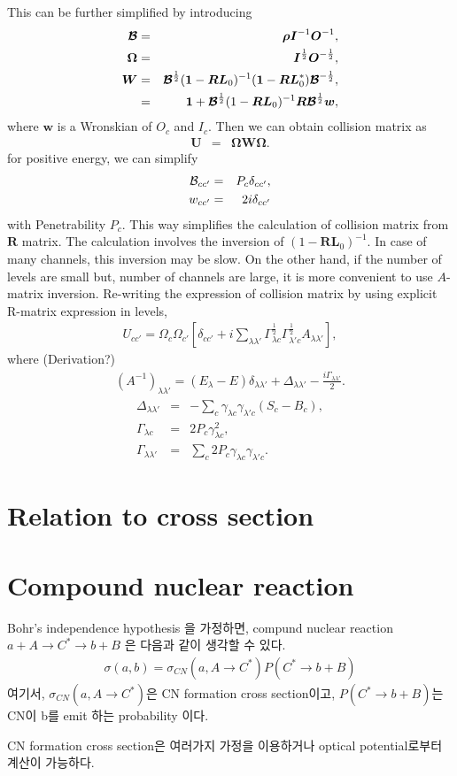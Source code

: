 \documentclass[11pt]{book}
\def\bm{\boldsymbol}
\newcommand{\bea}{\begin{eqnarray}}
\newcommand{\eea}{\end{eqnarray}}
\newcommand{\no}{\nonumber \\}
\begin{document}
This can be further simplified by introducing 
\bea 
{\bm{\cal B}}&=&{\bm \rho}{\bm I}^{-1}{\bm O}^{-1},\no 
{\bm \Omega}&=&{\bm I}^{\frac{1}{2}}{\bm O}^{-\frac{1}{2}},\no 
{\bm W}&=&{\bm{\cal B}}^{\frac{1}{2}} ({\bm 1}-{\bm R}{\bm L}_0)^{-1}({\bm 1}-{\bm R}{\bm L}_0^*){\bm{\cal B}}^{-\frac{1}{2}},\no 
    &=& {\bm 1}+{\bm{\cal B}}^{\frac{1}{2}}(1-{\bm R} {\bm L}_0)^{-1}{\bm R} {\bm{\cal B}}^{\frac{1}{2}}{\bm w},
\eea 
where ${\bm w}$ is a Wronskian of $O_c$ and $I_c$. 
Then we can obtain collision matrix as
\bea 
{\bm U}&=&{\bm \Omega}{\bm W}{\bm \Omega}.
\eea 
for positive energy, we can simplify 
\bea 
{\cal B}_{cc'}&=&P_{c}\delta_{cc'},\no 
w_{cc'}&=& 2 i \delta_{cc'} 
\eea 
with Penetrability $P_c$. This way simplifies the calculation of collision matrix from ${\bm R}$ matrix. 
The calculation involves the inversion of $(1-{\bm R} {\bm L}_0)^{-1}$. 
In case of many channels, this inversion may be slow. On the other hand, if the number of levels are
small but, number of channels are large, it is more convenient to use $A$-matrix inversion.
Re-writing the expression of collision matrix by using explicit R-matrix expression in levels,
\bea 
U_{cc'}=\Omega_{c}\Omega_{c'}\left[\delta_{cc'}
   +i\sum_{\lambda\lambda'}\Gamma_{\lambda c}^{\frac{1}{2}}\Gamma_{\lambda' c}^{\frac{1}{2}} 
     {A}_{\lambda\lambda'}\right] ,
\eea 
where (Derivation?)
\bea 
(A^{-1})_{\lambda\lambda'}=(E_\lambda-E)\delta_{\lambda\lambda'}+\Delta_{\lambda\lambda'}-\frac{i\Gamma_{\lambda\lambda'}}{2}.
\eea 
\bea 
\Delta_{\lambda\lambda'}&=& -\sum_{c}\gamma_{\lambda c}\gamma_{\lambda' c}(S_c-B_c),\no 
\Gamma_{\lambda c}&=& 2 P_c \gamma_{\lambda c}^2,\no 
\Gamma_{\lambda \lambda'}&=& \sum_{c} 2 P_c \gamma_{\lambda c}\gamma_{\lambda' c}.
\eea 
\section{Relation to cross section}

\section{Compound nuclear reaction}

Bohr's independence hypothesis 을 가정하면, compund nuclear reaction
$a+A\to C^*\to b+B$ 은
다음과 같이 생각할 수 있다. 
\bea 
 \sigma(a,b) = \sigma_{CN}(a,A\to C^*) P(C^*\to b+B)
\eea 
여기서, $\sigma_{CN}(a,A\to C^*)$은 CN formation cross section이고,
$P(C^*\to b+B)$는 CN이 b를 emit 하는 probability 이다. 

CN formation cross section은 여러가지 가정을 이용하거나 
optical potential로부터 계산이 가능하다. 
\end{document}
